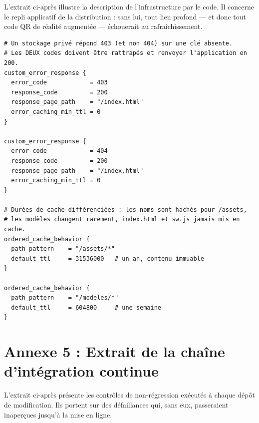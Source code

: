 L'extrait ci-après illustre la description de l'infrastructure par le code.
Il concerne le repli applicatif de la distribution : sans lui, tout lien profond
— et donc tout code QR de réalité augmentée — échouerait au rafraîchissement.

\begingroup\footnotesize
\begin{verbatim}
# Un stockage privé répond 403 (et non 404) sur une clé absente.
# Les DEUX codes doivent être rattrapés et renvoyer l'application en 200.
custom_error_response {
  error_code            = 403
  response_code         = 200
  response_page_path    = "/index.html"
  error_caching_min_ttl = 0
}

custom_error_response {
  error_code            = 404
  response_code         = 200
  response_page_path    = "/index.html"
  error_caching_min_ttl = 0
}

# Durées de cache différenciées : les noms sont hachés pour /assets,
# les modèles changent rarement, index.html et sw.js jamais mis en cache.
ordered_cache_behavior {
  path_pattern    = "/assets/*"
  default_ttl     = 31536000   # un an, contenu immuable
}

ordered_cache_behavior {
  path_pattern    = "/modeles/*"
  default_ttl     = 604800     # une semaine
}
\end{verbatim}
\endgroup


\cleardoublepage
\chapter*{Annexe 5 : Extrait de la chaîne d'intégration continue}

L'extrait ci-après présente les contrôles de non-régression exécutés à chaque
dépôt de modification. Ils portent sur des défaillances qui, sans eux,
passeraient inaperçues jusqu'à la mise en ligne.

